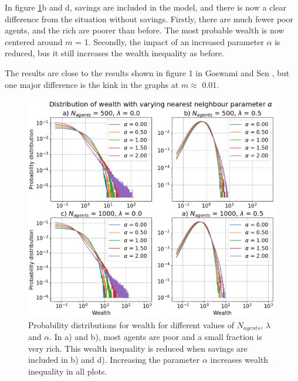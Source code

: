 \documentclass[11pt,a4paper,titlepage]{article}
\begin{document}
In figure \ref{fig:task_d_alpha}b and d, savings are included in the model, and there is now a clear difference from the situation without savings. Firstly, there are much fewer poor agents, and the rich are poorer than before. The most probable wealth is now centered around $m$ = 1. Secondly, the impact of an increased parameter $\alpha$ is reduced, bus it still increases the wealth inequality as before. 

The results are close to the results shown in figure 1 in Goswami and Sen \cite{Goswami}, but one major difference is the kink in the graphs at $m \approx$ 0.01. 



\begin{figure}[h!]
\centering
\includegraphics[scale=0.4]{task_d_alpha.png}
\caption{Probability distributions for wealth for different values of $N_{agents}$, $\lambda$ and $\alpha$. In a) and b), most agents are poor and a small fraction is very rich. This wealth inequality is reduced when savings are included in b) and d). Increasing the parameter $\alpha$ increases wealth inequality in all plots.  \label{fig:task_d_alpha}}
\end{figure}
\end{document}
